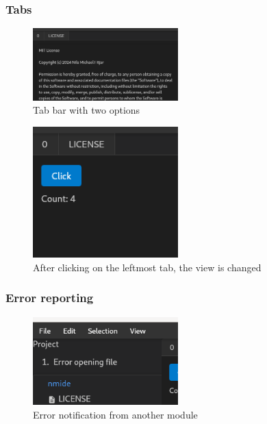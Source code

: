 \begin{frame}
  \frametitle{Tabs}
  \begin{figure}
    \centering
    \includegraphics[width=0.5\textwidth]{./pics/tabs.png}
    \caption{
      Tab bar with two options
    }
  \end{figure}
  \begin{figure}
    \centering
    \includegraphics[width=0.5\textwidth]{./pics/tab-switch.png}
    \caption{
      After clicking on the leftmost tab, the view is changed
    }
  \end{figure}
\end{frame}

\begin{frame}
  \frametitle{Error reporting}
  \begin{figure}
    \centering
    \includegraphics[width=0.5\textwidth]{./pics/errors.png}
    \caption{
      Error notification from another module
    }
  \end{figure}
\end{frame}

